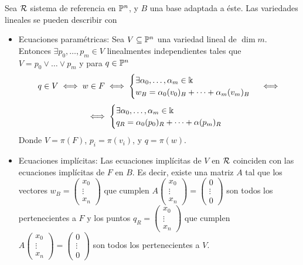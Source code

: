 \begin{obs}
    Sea $\mathcal{R}$ sistema de referencia en $\mathbb{P}^n$, y $B$ una base adaptada a éste. Las variedades lineales se pueden describir con
    \begin{itemize}
        \item Ecuaciones paramétricas: Sea $V \subseteq \mathbb{P}^n$ una variedad lineal de $\dim m$. Entonces
        $\exists p_0, \dots, p_m \in V$ linealmentes independientes tales que $V = p_0 \vee \dots \vee p_m$ y para $q \in \mathbb{P}^n$
        \[
            q \in V \iff w \in F \iff
            \begin{cases}
                \exists \alpha_0, \dots, \alpha_m \in \Bbbk \\
                w_B = \alpha_0(v_0)_B + \dots + \alpha_m(v_m)_B
            \end{cases}
            \iff
            \]
        \[
            \iff
            \begin{cases}
                \exists \alpha_0, \dots, \alpha_m \in \Bbbk \\
                q_R = \alpha_0 (p_0)_R + \dots + \alpha (p_m)_R
            \end{cases}
        \]
        Donde $V = \pi(F)$, $p_i = \pi(v_i)$, y $q = \pi(w)$.
        \item Ecuaciones implícitas: Las ecuaciones implícitas de $V$ en $\mathcal{R}$ coinciden con las ecuaciones implícitas de $F$ en
        $B$. Es decir, existe una matriz $A$ tal que los vectores $w_B = \begin{pmatrix} x_0 \\ \vdots \\ x_n \end{pmatrix}$ que cumplen $A \begin{pmatrix} x_0 \\ \vdots \\ x_n \end{pmatrix} =
        \begin{pmatrix} 0 \\ \vdots \\ 0 \end{pmatrix}$ son todos los pertenecientes a $F$ y los puntos
        $q_R = \begin{pmatrix} x_0 \\ \vdots \\ x_n \end{pmatrix}$ que cumplen $A \begin{pmatrix} x_0 \\ \vdots \\ x_n \end{pmatrix} =
        \begin{pmatrix} 0 \\ \vdots \\ 0 \end{pmatrix}$ son todos los pertenecientes a $V$.
    \end{itemize}
\end{obs}
